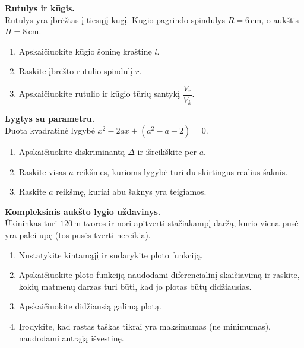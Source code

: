 \begin{exercise}
\textbf{Rutulys ir kūgis.}\\
Rutulys yra įbrėžtas į tiesųjį kūgį. Kūgio pagrindo spindulys $R = 6$\,cm,
o aukštis $H = 8$\,cm.
\begin{enumerate}[label=\arabic*.]
  \item Apskaičiuokite kūgio šoninę kraštinę $l$.
  \item Raskite įbrėžto rutulio spindulį $r$.
  \item Apskaičiuokite rutulio ir kūgio tūrių santykį $\dfrac{V_r}{V_k}$.
\end{enumerate}
\end{exercise}

\begin{exercise}
\textbf{Lygtys su parametru.}\\
Duota kvadratinė lygybė $x^2 - 2ax + (a^2 - a - 2) = 0$.
\begin{enumerate}[label=\arabic*.]
  \item Apskaičiuokite diskriminantą $\Delta$ ir išreikškite per $a$.
  \item Raskite visas $a$ reikšmes, kurioms lygybė turi du skirtingus
        realius šaknis.
  \item Raskite $a$ reikšmę, kuriai abu šaknys yra teigiamos.
\end{enumerate}
\end{exercise}

\begin{exercise}
\textbf{Kompleksinis aukšto lygio uždavinys.}\\
Ūkininkas turi $120$\,m tvoros ir nori apitverti stačiakampį daržą, kurio
viena pusė yra palei upę (tos pusės tverti nereikia).
\begin{enumerate}[label=\arabic*.]
  \item Nustatykite kintamąjį ir sudarykite ploto funkciją.
  \item Apskaičiuokite ploto funkciją naudodami diferencialinį skaičiavimą
        ir raskite, kokių matmenų darzas turi būti, kad jo plotas būtų
        didžiausias.
  \item Apskaičiuokite didžiausią galimą plotą.
  \item Įrodykite, kad rastas taškas tikrai yra maksimumas (ne minimumas),
        naudodami antrąją išvestinę.
\end{enumerate}
\end{exercise}

